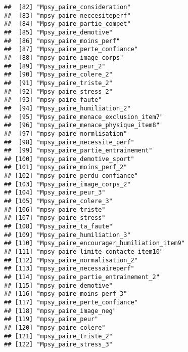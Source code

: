 \documentclass[
]{article}
\begin{document}
\begin{verbatim}
##  [82] "Mpsy_paire_consideration"                            
##  [83] "mpsy_paire_neccesiteperf"                            
##  [84] "Mpsy_paire_partie_compet"                            
##  [85] "Mpsy_paire_demotive"                                 
##  [86] "mpsy_paire_moins_perf"                               
##  [87] "Mpsy_paire_perte_confiance"                          
##  [88] "mpsy_paire_image_corps"                              
##  [89] "Mpsy_paire_peur_2"                                   
##  [90] "Mpsy_paire_colere_2"                                 
##  [91] "Mpsy_paire_triste_2"                                 
##  [92] "Mpsy_paire_stress_2"                                 
##  [93] "mpsy_paire_faute"                                    
##  [94] "Mpsy_paire_humiliation_2"                            
##  [95] "Mpsy_paire_menace_exclusion_item7"                   
##  [96] "mpsy_paire_menace_physique_item8"                    
##  [97] "mpsy_paire_normlisation"                             
##  [98] "mpsy_paire_necessite_perf"                           
##  [99] "mpsy_paire_partie_entrainement"                      
## [100] "mpsy_paire_demotive_sport"                           
## [101] "mpsy_paire_moins_perf_2"                             
## [102] "mpsy_paire_perdu_confiance"                          
## [103] "Mpsy_paire_image_corps_2"                            
## [104] "Mpsy_paire_peur_3"                                   
## [105] "Mpsy_paire_colere_3"                                 
## [106] "mpsy_paire_triste"                                   
## [107] "mpsy_paire_stress"                                   
## [108] "Mpsy_paire_ta_faute"                                 
## [109] "Mpsy_paire_humiliation_3"                            
## [110] "Mpsy_paire_encourager_humiliation_item9"             
## [111] "mpsy_paire_limite_contacte_item10"                   
## [112] "Mpsy_paire_normalisation_2"                          
## [113] "mpsy_paire_necessaireperf"                           
## [114] "mpsy_paire_partie_entrainement_2"                    
## [115] "mpsy_paire_demotive"                                 
## [116] "mpsy_paire_moins_perf_3"                             
## [117] "mpsy_paire_perte_confiance"                          
## [118] "mpsy_paire_image_neg"                                
## [119] "mpsy_paire_peur"                                     
## [120] "mpsy_paire_colere"                                   
## [121] "mpsy_paire_triste_2"                                 
## [122] "Mpsy_paire_stress_3"                                 

\end{verbatim}
\end{document}
